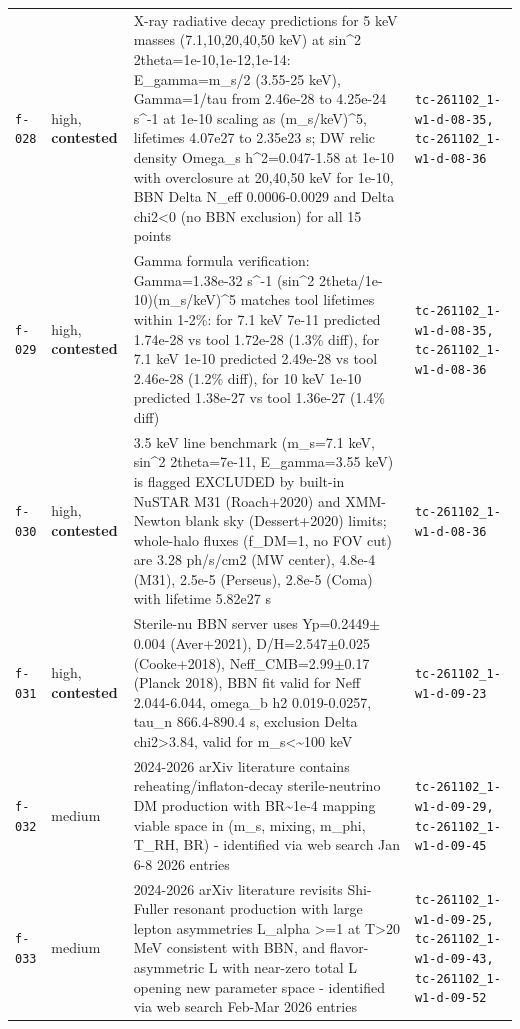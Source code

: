 \documentclass[11pt,a4paper]{article}
\begin{document}
\begin{longtable}{@{}p{}p{}p{}p{}@{}}
\texttt{f-028} & high, \textbf{contested} & X-ray radiative decay predictions for 5 keV masses (7.1,10,20,40,50 keV) at sin\textasciicircum{}2 2theta=1e-10,1e-12,1e-14: E\_gamma=m\_s/2 (3.55-25 keV), Gamma=1/tau from 2.46e-28 to 4.25e-24 s\textasciicircum{}-1 at 1e-10 scaling as (m\_s/keV)\textasciicircum{}5, lifetimes 4.07e27 to 2.35e23 s; DW relic density Omega\_s h\textasciicircum{}2=0.047-1.58 at 1e-10 with overclosure at 20,40,50 keV for 1e-10, BBN Delta N\_eff 0.0006-0.0029 and Delta chi2\textless{}0 (no BBN exclusion) for all 15 points & \texttt{tc-261102\_\allowbreak{}1-w1-d-08-35,\allowbreak{} tc-261102\_\allowbreak{}1-w1-d-08-36} \\
\texttt{f-029} & high, \textbf{contested} & Gamma formula verification: Gamma=1.38e-32 s\textasciicircum{}-1 (sin\textasciicircum{}2 2theta/1e-10)(m\_s/keV)\textasciicircum{}5 matches tool lifetimes within 1-2\%: for 7.1 keV 7e-11 predicted 1.74e-28 vs tool 1.72e-28 (1.3\% diff), for 7.1 keV 1e-10 predicted 2.49e-28 vs tool 2.46e-28 (1.2\% diff), for 10 keV 1e-10 predicted 1.38e-27 vs tool 1.36e-27 (1.4\% diff) & \texttt{tc-261102\_\allowbreak{}1-w1-d-08-35,\allowbreak{} tc-261102\_\allowbreak{}1-w1-d-08-36} \\
\texttt{f-030} & high, \textbf{contested} & 3.5 keV line benchmark (m\_s=7.1 keV, sin\textasciicircum{}2 2theta=7e-11, E\_gamma=3.55 keV) is flagged EXCLUDED by built-in NuSTAR M31 (Roach+2020) and XMM-Newton blank sky (Dessert+2020) limits; whole-halo fluxes (f\_DM=1, no FOV cut) are 3.28 ph/s/cm2 (MW center), 4.8e-4 (M31), 2.5e-5 (Perseus), 2.8e-5 (Coma) with lifetime 5.82e27 s & \texttt{tc-261102\_\allowbreak{}1-w1-d-08-36} \\
\texttt{f-031} & high, \textbf{contested} & Sterile-nu BBN server uses Yp=0.2449$\pm$0.004 (Aver+2021), D/H=2.547$\pm$0.025 (Cooke+2018), Neff\_CMB=2.99$\pm$0.17 (Planck 2018), BBN fit valid for Neff 2.044-6.044, omega\_b h2 0.019-0.0257, tau\_n 866.4-890.4 s, exclusion Delta chi2\textgreater{}3.84, valid for m\_s\textless{}\textasciitilde{}100 keV & \texttt{tc-261102\_\allowbreak{}1-w1-d-09-23} \\
\texttt{f-032} & medium & 2024-2026 arXiv literature contains reheating/inflaton-decay sterile-neutrino DM production with BR\textasciitilde{}1e-4 mapping viable space in (m\_s, mixing, m\_phi, T\_RH, BR) - identified via web search Jan 6-8 2026 entries & \texttt{tc-261102\_\allowbreak{}1-w1-d-09-29,\allowbreak{} tc-261102\_\allowbreak{}1-w1-d-09-45} \\
\texttt{f-033} & medium & 2024-2026 arXiv literature revisits Shi-Fuller resonant production with large lepton asymmetries L\_alpha \textgreater{}=1 at T\textgreater{}20 MeV consistent with BBN, and flavor-asymmetric L with near-zero total L opening new parameter space - identified via web search Feb-Mar 2026 entries & \texttt{tc-261102\_\allowbreak{}1-w1-d-09-25,\allowbreak{} tc-261102\_\allowbreak{}1-w1-d-09-43,\allowbreak{} tc-261102\_\allowbreak{}1-w1-d-09-52} \\

\end{longtable}
\end{document}
